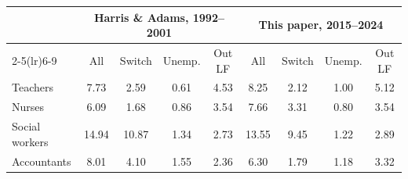 \begin{tabular}{lcccccccc}
\toprule
 & \multicolumn{4}{c}{Harris \& Adams, 1992--2001} & \multicolumn{4}{c}{This paper, 2015--2024} \\
\cmidrule(lr){2-5}\cmidrule(lr){6-9}
 & All & Switch & Unemp. & Out LF & All & Switch & Unemp. & Out LF \\
\midrule
Teachers & 7.73 & 2.59 & 0.61 & 4.53 & 8.25 & 2.12 & 1.00 & 5.12 \\
Nurses & 6.09 & 1.68 & 0.86 & 3.54 & 7.66 & 3.31 & 0.80 & 3.54 \\
Social workers & 14.94 & 10.87 & 1.34 & 2.73 & 13.55 & 9.45 & 1.22 & 2.89 \\
Accountants & 8.01 & 4.10 & 1.55 & 2.36 & 6.30 & 1.79 & 1.18 & 3.32 \\
\bottomrule
\end{tabular}
